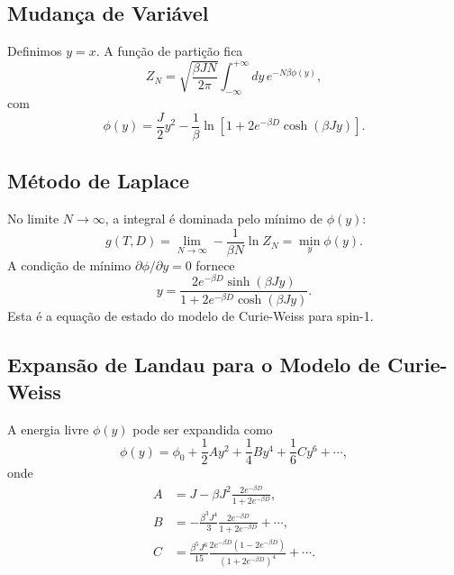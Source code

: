 \documentclass[12pt]{article}
\begin{document}
\subsection{Mudança de Variável}

Definimos $y = x$. A função de partição fica
\begin{equation}
    Z_N = \sqrt{\frac{\beta J N}{2\pi}} \int_{-\infty}^{+\infty} dy \, e^{-N \beta \phi(y)},
\end{equation}
com
\begin{equation}
    \phi(y) = \frac{J}{2} y^2 - \frac{1}{\beta} \ln\left[ 1 + 2 e^{-\beta D} \cosh(\beta J y) \right].
\end{equation}

\subsection{Método de Laplace}

No limite $N \to \infty$, a integral é dominada pelo mínimo de $\phi(y)$:
\begin{equation}
    g(T,D) = \lim_{N \to \infty} -\frac{1}{\beta N} \ln Z_N = \min_y \phi(y).
\end{equation}
A condição de mínimo $\partial \phi/\partial y = 0$ fornece
\begin{equation}
    y = \frac{2 e^{-\beta D} \sinh(\beta J y)}{1 + 2 e^{-\beta D} \cosh(\beta J y)}.
\end{equation}
Esta é a equação de estado do modelo de Curie-Weiss para spin-1.

\subsection{Expansão de Landau para o Modelo de Curie-Weiss}

A energia livre $\phi(y)$ pode ser expandida como
\begin{equation}
    \phi(y) = \phi_0 + \frac{1}{2} A y^2 + \frac{1}{4} B y^4 + \frac{1}{6} C y^6 + \cdots,
\end{equation}
onde
\begin{align}
    A &= J - \beta J^2 \frac{2 e^{-\beta D}}{1 + 2 e^{-\beta D}}, \\
    B &= -\frac{\beta^3 J^4}{3} \frac{2 e^{-\beta D}}{1 + 2 e^{-\beta D}} + \cdots, \\
    C &= \frac{\beta^5 J^6}{15} \frac{2 e^{-\beta D}(1 - 2 e^{-\beta D})}{(1 + 2 e^{-\beta D})^4} + \cdots.
\end{align}
\end{document}
